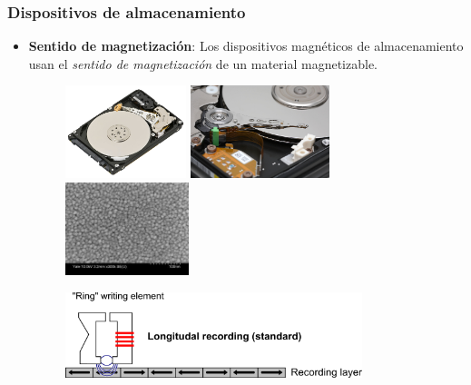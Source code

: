 \documentclass[aspectratio=169]{beamer}
\begin{document}
\begin{frame}[fragile]\frametitle{Dispositivos de almacenamiento}
\begin{itemize}
	\item \textbf{Sentido de magnetización}: Los dispositivos magnéticos de almacenamiento usan el \textit{sentido de magnetización} de un material magnetizable.
	\begin{figure}
		\begin{center}
		\includegraphics[height=2.7cm]{figs/1280px-Laptop-hard-drive-exposed.jpg}	\includegraphics[height=2.7cm]{figs/1280px-Hard_disk_platters_and_head.jpg}\hspace{0.3cm}\includegraphics[height=2.7cm]{figs/HardDrivesGrainsSEM100nm-300x225.jpg}
		\end{center}
		\end{figure}
		\begin{figure}
			\begin{center}
			\includegraphics[height=2.5cm]{figs/Recording_Diagram.png}
			\end{center}
			\end{figure}
\end{itemize}
\end{frame}
\end{document}
